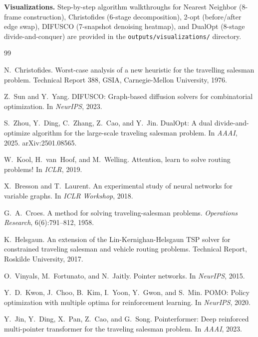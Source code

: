 \documentclass[11pt,a4paper]{article}
\begin{document}
\textbf{Visualizations.} Step-by-step algorithm walkthroughs for Nearest Neighbor (8-frame construction), Christofides (6-stage decomposition), 2-opt (before/after edge swap), DIFUSCO (7-snapshot denoising heatmap), and DualOpt (8-stage divide-and-conquer) are provided in the \texttt{outputs/visualizations/} directory.


\begin{thebibliography}{99}

N.~Christofides.
\newblock Worst-case analysis of a new heuristic for the travelling salesman problem.
\newblock Technical Report 388, GSIA, Carnegie-Mellon University, 1976.

Z.~Sun and Y.~Yang.
\newblock DIFUSCO: Graph-based diffusion solvers for combinatorial optimization.
\newblock In \emph{NeurIPS}, 2023.

S.~Zhou, Y.~Ding, C.~Zhang, Z.~Cao, and Y.~Jin.
\newblock DualOpt: A dual divide-and-optimize algorithm for the large-scale traveling salesman problem.
\newblock In \emph{AAAI}, 2025. arXiv:2501.08565.

W.~Kool, H.~van~Hoof, and M.~Welling.
\newblock Attention, learn to solve routing problems!
\newblock In \emph{ICLR}, 2019.

X.~Bresson and T.~Laurent.
\newblock An experimental study of neural networks for variable graphs.
\newblock In \emph{ICLR Workshop}, 2018.

G.~A.~Croes.
\newblock A method for solving traveling-salesman problems.
\newblock \emph{Operations Research}, 6(6):791--812, 1958.

K.~Helsgaun.
\newblock An extension of the Lin-Kernighan-Helsgaun TSP solver for constrained traveling salesman and vehicle routing problems.
\newblock Technical Report, Roskilde University, 2017.

O.~Vinyals, M.~Fortunato, and N.~Jaitly.
\newblock Pointer networks.
\newblock In \emph{NeurIPS}, 2015.

Y.~D.~Kwon, J.~Choo, B.~Kim, I.~Yoon, Y.~Gwon, and S.~Min.
\newblock POMO: Policy optimization with multiple optima for reinforcement learning.
\newblock In \emph{NeurIPS}, 2020.

Y.~Jin, Y.~Ding, X.~Pan, Z.~Cao, and G.~Song.
\newblock Pointerformer: Deep reinforced multi-pointer transformer for the traveling salesman problem.
\newblock In \emph{AAAI}, 2023.


\end{thebibliography}
\end{document}
